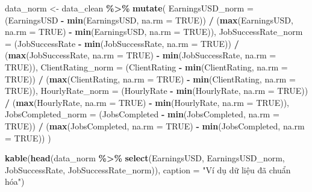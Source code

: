 \documentclass[
]{article}
\newenvironment{Shaded}{\begin{snugshade}}{\end{snugshade}}
\newcommand{\AttributeTok}[1]{\textcolor[rgb]{0.13,0.29,0.53}{#1}}
\newcommand{\ConstantTok}[1]{\textcolor[rgb]{0.56,0.35,0.01}{#1}}
\newcommand{\FunctionTok}[1]{\textcolor[rgb]{0.13,0.29,0.53}{\textbf{#1}}}
\newcommand{\NormalTok}[1]{#1}
\newcommand{\OtherTok}[1]{\textcolor[rgb]{0.56,0.35,0.01}{#1}}
\newcommand{\SpecialCharTok}[1]{\textcolor[rgb]{0.81,0.36,0.00}{\textbf{#1}}}
\newcommand{\StringTok}[1]{\textcolor[rgb]{0.31,0.60,0.02}{#1}}
\begin{document}
\begin{Shaded}
\begin{Highlighting}[]
\NormalTok{data\_norm }\OtherTok{\textless{}{-}}\NormalTok{ data\_clean }\SpecialCharTok{\%\textgreater{}\%}
  \FunctionTok{mutate}\NormalTok{(}
    \AttributeTok{EarningsUSD\_norm =}\NormalTok{ (EarningsUSD }\SpecialCharTok{{-}} \FunctionTok{min}\NormalTok{(EarningsUSD, }\AttributeTok{na.rm =} \ConstantTok{TRUE}\NormalTok{)) }\SpecialCharTok{/}\NormalTok{ (}\FunctionTok{max}\NormalTok{(EarningsUSD, }\AttributeTok{na.rm =} \ConstantTok{TRUE}\NormalTok{) }\SpecialCharTok{{-}} \FunctionTok{min}\NormalTok{(EarningsUSD, }\AttributeTok{na.rm =} \ConstantTok{TRUE}\NormalTok{)),}
    \AttributeTok{JobSuccessRate\_norm =}\NormalTok{ (JobSuccessRate }\SpecialCharTok{{-}} \FunctionTok{min}\NormalTok{(JobSuccessRate, }\AttributeTok{na.rm =} \ConstantTok{TRUE}\NormalTok{)) }\SpecialCharTok{/}\NormalTok{ (}\FunctionTok{max}\NormalTok{(JobSuccessRate, }\AttributeTok{na.rm =} \ConstantTok{TRUE}\NormalTok{) }\SpecialCharTok{{-}} \FunctionTok{min}\NormalTok{(JobSuccessRate, }\AttributeTok{na.rm =} \ConstantTok{TRUE}\NormalTok{)),}
    \AttributeTok{ClientRating\_norm =}\NormalTok{ (ClientRating }\SpecialCharTok{{-}} \FunctionTok{min}\NormalTok{(ClientRating, }\AttributeTok{na.rm =} \ConstantTok{TRUE}\NormalTok{)) }\SpecialCharTok{/}\NormalTok{ (}\FunctionTok{max}\NormalTok{(ClientRating, }\AttributeTok{na.rm =} \ConstantTok{TRUE}\NormalTok{) }\SpecialCharTok{{-}} \FunctionTok{min}\NormalTok{(ClientRating, }\AttributeTok{na.rm =} \ConstantTok{TRUE}\NormalTok{)),}
    \AttributeTok{HourlyRate\_norm =}\NormalTok{ (HourlyRate }\SpecialCharTok{{-}} \FunctionTok{min}\NormalTok{(HourlyRate, }\AttributeTok{na.rm =} \ConstantTok{TRUE}\NormalTok{)) }\SpecialCharTok{/}\NormalTok{ (}\FunctionTok{max}\NormalTok{(HourlyRate, }\AttributeTok{na.rm =} \ConstantTok{TRUE}\NormalTok{) }\SpecialCharTok{{-}} \FunctionTok{min}\NormalTok{(HourlyRate, }\AttributeTok{na.rm =} \ConstantTok{TRUE}\NormalTok{)),}
    \AttributeTok{JobsCompleted\_norm =}\NormalTok{ (JobsCompleted }\SpecialCharTok{{-}} \FunctionTok{min}\NormalTok{(JobsCompleted, }\AttributeTok{na.rm =} \ConstantTok{TRUE}\NormalTok{)) }\SpecialCharTok{/}\NormalTok{ (}\FunctionTok{max}\NormalTok{(JobsCompleted, }\AttributeTok{na.rm =} \ConstantTok{TRUE}\NormalTok{) }\SpecialCharTok{{-}} \FunctionTok{min}\NormalTok{(JobsCompleted, }\AttributeTok{na.rm =} \ConstantTok{TRUE}\NormalTok{))}
\NormalTok{  )}

\FunctionTok{kable}\NormalTok{(}\FunctionTok{head}\NormalTok{(data\_norm }\SpecialCharTok{\%\textgreater{}\%} \FunctionTok{select}\NormalTok{(EarningsUSD, EarningsUSD\_norm, JobSuccessRate, JobSuccessRate\_norm)), }
      \AttributeTok{caption =} \StringTok{"Ví dụ dữ liệu đã chuẩn hóa"}\NormalTok{)}
\end{Highlighting}
\end{Shaded}
\end{document}
